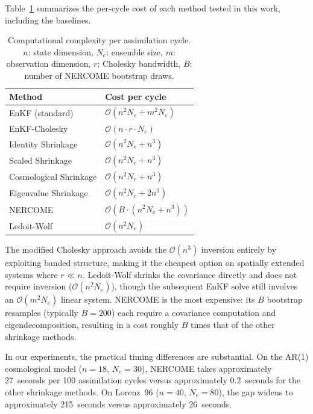 Table~\ref{tab:complexity} summarizes the per-cycle cost of each method tested in this work, including the baselines.

\begin{table}[t]
\centering
\caption{Computational complexity per assimilation cycle. $n$: state dimension, $N_e$: ensemble size, $m$: observation dimension, $r$: Cholesky bandwidth, $B$: number of NERCOME bootstrap draws.}
\label{tab:complexity}
\begin{tabular}{@{}ll@{}}
\toprule
Method & Cost per cycle \\
\midrule
EnKF (standard)              & $\mathcal{O}(n^2 N_e + m^2 N_e)$ \\
EnKF-Cholesky                & $\mathcal{O}(n \cdot r \cdot N_e)$ \\
Identity Shrinkage           & $\mathcal{O}(n^2 N_e + n^3)$ \\
Scaled Shrinkage             & $\mathcal{O}(n^2 N_e + n^3)$ \\
Cosmological Shrinkage       & $\mathcal{O}(n^2 N_e + n^3)$ \\
Eigenvalue Shrinkage         & $\mathcal{O}(n^2 N_e + 2n^3)$ \\
NERCOME                      & $\mathcal{O}(B \cdot (n^2 N_e + n^3))$ \\
Ledoit-Wolf                  & $\mathcal{O}(n^2 N_e)$ \\
\bottomrule
\end{tabular}
\end{table}

The modified Cholesky approach avoids the $\mathcal{O}(n^3)$ inversion entirely by exploiting banded structure, making it the cheapest option on spatially extended systems where $r \ll n$. Ledoit-Wolf shrinks the covariance directly and does not require inversion ($\mathcal{O}(n^2 N_e)$), though the subsequent EnKF solve still involves an $\mathcal{O}(m^2 N_e)$ linear system. NERCOME is the most expensive: its $B$ bootstrap resamples (typically $B = 200$) each require a covariance computation and eigendecomposition, resulting in a cost roughly $B$ times that of the other shrinkage methods.

In our experiments, the practical timing differences are substantial. On the AR(1) cosmological model ($n = 18$, $N_e = 30$), NERCOME takes approximately 27~seconds per 100 assimilation cycles versus approximately 0.2~seconds for the other shrinkage methods. On Lorenz~96 ($n = 40$, $N_e = 80$), the gap widens to approximately 215~seconds versus approximately 26~seconds.

